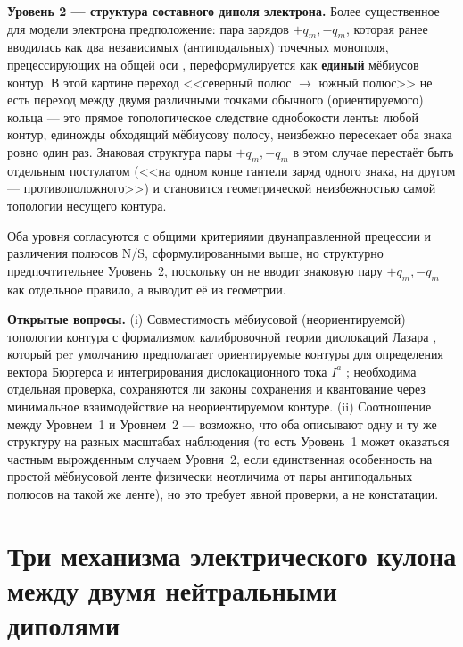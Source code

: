 \documentclass[12pt,a4paper]{article}
\begin{document}
\textbf{Уровень 2 --- структура составного диполя электрона.} Более
существенное для модели электрона предположение: пара зарядов
$+q_m,-q_m$, которая ранее вводилась как два независимых
(антиподальных) точечных монополя, прецессирующих на общей оси
\cite{coax_current_rings}, переформулируется как \textbf{единый}
мёбиусов контур. В этой картине переход <<северный полюс $\to$ южный
полюс>> не есть переход между двумя различными точками обычного
(ориентируемого) кольца --- это прямое топологическое следствие
однобокости ленты: любой контур, единожды обходящий мёбиусову
полосу, неизбежно пересекает оба знака ровно один раз. Знаковая
структура пары $+q_m,-q_m$ в этом случае перестаёт быть отдельным
постулатом (<<на одном конце гантели заряд одного знака, на другом ---
противоположного>>) и становится геометрической неизбежностью самой
топологии несущего контура.

Оба уровня согласуются с общими критериями двунаправленной прецессии и
различения полюсов N/S, сформулированными выше, но структурно
предпочтительнее Уровень~2, поскольку он не вводит знаковую пару
$+q_m,-q_m$ как отдельное правило, а выводит её из геометрии.

\textbf{Открытые вопросы.} (i) Совместимость мёбиусовой (неориентируемой)
топологии контура с формализмом калибровочной теории дислокаций Лазара
\cite{Lazar2010}, который per умолчанию предполагает ориентируемые
контуры для определения вектора Бюргерса и интегрирования дислокационного
тока $I^a$ \cite{Lazar2010}; необходима отдельная проверка, сохраняются
ли законы сохранения и квантование через минимальное взаимодействие
\cite{Braginsky2018,Braginsky2016} на неориентируемом контуре.
(ii) Соотношение между Уровнем~1 и Уровнем~2 --- возможно, что оба
описывают одну и ту же структуру на разных масштабах наблюдения (то есть
Уровень~1 может оказаться частным вырожденным случаем Уровня~2, если
единственная особенность на простой мёбиусовой ленте физически неотличима
от пары антиподальных полюсов на такой же ленте), но это требует
явной проверки, а не констатации.



\section{Три механизма электрического кулона между двумя нейтральными диполями}
\label{sec:variants}
\end{document}
